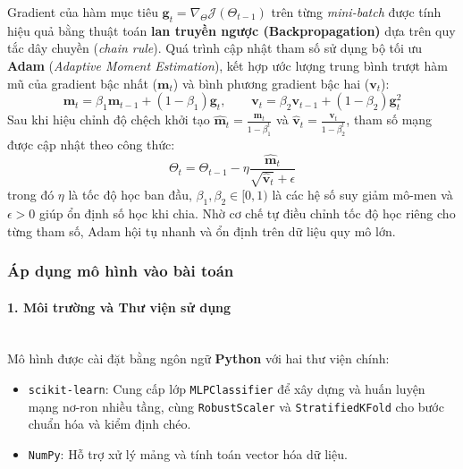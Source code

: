 Gradient của hàm mục tiêu $\mathbf{g}_t = \nabla_{\Theta}\mathcal{J}(\Theta_{t-1})$ trên từng \textit{mini-batch} được tính hiệu quả bằng thuật toán \textbf{lan truyền ngược (Backpropagation)} dựa trên quy tắc dây chuyền (\textit{chain rule}). Quá trình cập nhật tham số sử dụng bộ tối ưu \textbf{Adam} (\textit{Adaptive Moment Estimation}), kết hợp ước lượng trung bình trượt hàm mũ của gradient bậc nhất ($\mathbf{m}_t$) và bình phương gradient bậc hai ($\mathbf{v}_t$):
\begin{equation}
    \mathbf{m}_t = \beta_1 \mathbf{m}_{t-1} + (1 - \beta_1)\mathbf{g}_t, \qquad \mathbf{v}_t = \beta_2 \mathbf{v}_{t-1} + (1 - \beta_2)\mathbf{g}_t^2
\end{equation}
Sau khi hiệu chỉnh độ chệch khởi tạo $\hat{\mathbf{m}}_t = \frac{\mathbf{m}_t}{1 - \beta_1^t}$ và $\hat{\mathbf{v}}_t = \frac{\mathbf{v}_t}{1 - \beta_2^t}$, tham số mạng được cập nhật theo công thức:
\begin{equation}
    \Theta_t = \Theta_{t-1} - \eta \frac{\hat{\mathbf{m}}_t}{\sqrt{\hat{\mathbf{v}}_t} + \epsilon}
\end{equation}
trong đó $\eta$ là tốc độ học ban đầu, $\beta_1, \beta_2 \in [0, 1)$ là các hệ số suy giảm mô-men và $\epsilon > 0$ giúp ổn định số học khi chia. Nhờ cơ chế tự điều chỉnh tốc độ học riêng cho từng tham số, Adam hội tụ nhanh và ổn định trên dữ liệu quy mô lớn.

\subsubsection{Áp dụng mô hình vào bài toán}

\paragraph{1. Môi trường và Thư viện sử dụng}\mbox{}\\
Mô hình được cài đặt bằng ngôn ngữ \textbf{Python} với hai thư viện chính:
\begin{itemize}
    \item \texttt{scikit-learn}: Cung cấp lớp \texttt{MLPClassifier} để xây dựng và huấn luyện mạng nơ-ron nhiều tầng, cùng \texttt{RobustScaler} và \texttt{StratifiedKFold} cho bước chuẩn hóa và kiểm định chéo.
    \item \texttt{NumPy}: Hỗ trợ xử lý mảng và tính toán vector hóa dữ liệu.
\end{itemize}

